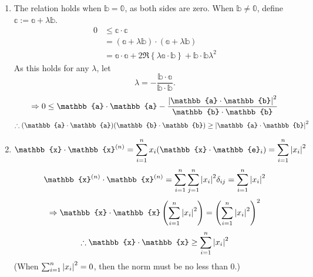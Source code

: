 \item

\begin{enumerate}[wide, labelindent = 0pt, label = (\alph*)]
\item
The relation holds when $\mathbb{b} = \mathbb{0}$, as both sides are zero.
When $\mathbb{b} \neq \mathbb{0}$, define $\mathbb{c} := \mathbb{a} + \lambda \mathbb{b}$.
\begin{align*}
    0
    &\leq \mathbb{c} \cdot \mathbb{c} \\
    &= \left( \mathbb{a} + \lambda \mathbb{b} \right) \cdot \left( \mathbb{a} + \lambda \mathbb{b} \right) \\
    &= \mathbb{a} \cdot \mathbb{a}
     + 2\Re\left\{ \lambda \mathbb{a} \cdot \mathbb{b} \right\}
     + \mathbb{b} \cdot \mathbb{b} \lambda^2
\end{align*}
As this holds for any $\lambda$, let
\[
    \lambda = -\frac{\mathbb{b} \cdot \mathbb{a}}{\mathbb{b} \cdot \mathbb{b}}.
\]
\[
    \Rightarrow 0
    \leq \mathbb{a} \cdot \mathbb{a} - \frac{
        {\abs{\mathbb{a} \cdot \mathbb{b}}}^2
    }{\mathbb{b} \cdot \mathbb{b}}
\]
\[
    \therefore (\mathbb{a} \cdot \mathbb{a}) (\mathbb{b} \cdot \mathbb{b})
    \geq {\abs{\mathbb{a} \cdot \mathbb{b}}}^2
\]

\item
\[
    \mathbb{x} \cdot \mathbb{x}^{(n)}
    = \sum_{i = 1}^n x_i (\mathbb{x} \cdot \mathbb{e}_i)
    = \sum_{i = 1}^n {\abs{x_i}}^2
\]
\[
    \mathbb{x}^{(n)} \cdot \mathbb{x}^{(n)}
    = \sum_{i = 1}^n \sum_{j = 1}^n {\abs{x_i}}^2 \delta_{ij}
    = \sum_{i = 1}^n {\abs{x_i}}^2
\]
\[
    \Rightarrow \mathbb{x} \cdot \mathbb{x} \left(
        \sum_{i = 1}^n {\abs{x_i}}^2
    \right)
    = {\left(
       \sum_{i = 1}^n {\abs{x_i}}^2
    \right)}^2
\]
\[
    \therefore \mathbb{x} \cdot \mathbb{x} \geq \sum_{i = 1}^n {\abs{x_i}}^2
\]
(When $\sum_{i = 1}^n {\left| x_i \right|}^2 = 0$, then the norm must be no less than 0.)
\end{enumerate}
